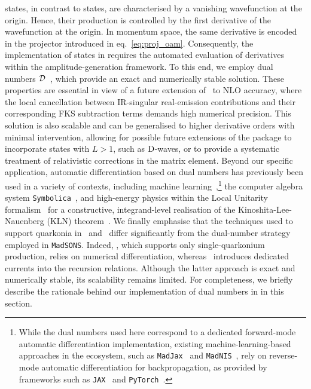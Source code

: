 {\pwavetxt} states, in contrast to {\swavetxt} states, are characterised by a vanishing wavefunction at the origin. Hence, their production is controlled by the first derivative of the wavefunction at the origin. In momentum space, the same derivative is encoded in the projector introduced in eq.~\eqref{eq:proj_oam}.
Consequently, the implementation of \pwavetxt{} states in \mgshort{} requires the automated evaluation of derivatives within the amplitude-generation framework.
To this end, we employ dual numbers ${\cal D}$~\cite{Clifford:1871aaa}, which provide an exact and numerically stable solution. These properties are essential in view of a future extension of \madsons\ to NLO accuracy, where the local cancellation between IR-singular real-emission contributions and their corresponding FKS subtraction terms demands high numerical precision. 
This solution is also scalable and can be generalised to higher derivative orders with minimal intervention, allowing for possible future extensions of the package to incorporate states with $L>1$, such as ${\rm D}$-waves, or to provide a systematic treatment of relativistic corrections in the matrix element.
Beyond our specific application, automatic differentiation based on dual numbers has previously been used in a variety of contexts, including machine learning~\cite{Baydin:2015tfa},\footnote{While the dual numbers used here correspond to a dedicated forward-mode automatic differentiation implementation, existing machine-learning-based approaches in the \mgshort{} ecosystem, such as {\tt MadJax}~\cite{Heinrich:2022xfa} and {\tt MadNIS}~\cite{Heimel:2022wyj,Heimel:2023ngj}, rely on reverse-mode automatic differentiation for backpropagation, as provided by frameworks such as {\tt JAX}~\cite{jax2018github} and {\tt PyTorch}~\cite{NEURIPS2019_9015pytorch}.} the computer algebra system {\tt Symbolica}~\cite{Symbolica}, and high-energy physics within the Local Unitarity formalism~\cite{Capatti:2020xjc,Capatti:2022tit} for a constructive, integrand-level realisation of the Kinoshita-Lee-Nauenberg (KLN) theorem~\cite{Kinoshita:1962ur,Lee:1964is}.
We finally emphasise that the techniques used to support {\pwavetxt} quarkonia in \madonia\ and \helaconia\ differ significantly from the dual-number strategy employed in {\tt MadSONS}. Indeed, \madonia, which supports only single-quarkonium production, relies on numerical differentiation, whereas \helaconia\ introduces dedicated {\pwavetxt} currents into the recursion relations. Although the latter approach is exact and numerically stable, its scalability remains limited. For completeness, we briefly describe the rationale behind our implementation of dual numbers in \mgshort{} in this section.

